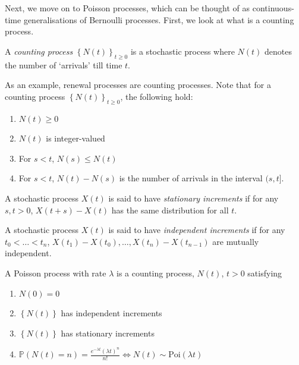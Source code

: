 \documentclass[12pt]{article}
\def\P{\mathbb{P}}
\def\ddfrac#1#2{\displaystyle\frac{\displaystyle #1}{\displaystyle #2}}
\theoremstyle{definition}
\begin{document}
    \medskip
    
    Next, we move on to Poisson processes, which can be thought of as continuous-time generalisations of Bernoulli processes. First, we look at what is a counting process. 
    
    \begin{defn}
        A \emph{counting process} $\left\{ N(t) \right\}_{t \geq 0}$ is a stochastic process where $N(t)$ denotes the number of `arrivals' till time $t$.
    \end{defn}
    As an example, renewal processes are counting processes. Note that for a counting process $\left\{ N(t) \right\}_{t \geq 0}$, the following hold:
    \begin{enumerate}
        \item $N(t) \geq 0$
        \item $N(t)$ is integer-valued
        \item For $s<t$, $N(s) \leq N(t)$
        \item For $s<t$, $N(t) - N(s)$ is the number of arrivals in the interval $(s,t]$.
    \end{enumerate}
    
    \begin{defn}
    A stochastic process $X(t)$ is said to have \emph{stationary increments} if for any $s,t > 0$, $X(t+s) - X(t)$ has the same distribution for all $t$.  
    \end{defn}
    
    \begin{defn}
    A stochastic process $X(t)$ is said to have \emph{independent increments} if for any $t_0 < \ldots < t_n$, $X(t_1) - X(t_0), \ldots , X(t_n) - X(t_{n-1})$ are mutually independent.
    \end{defn}
    
    \begin{defn}
        A Poisson process with rate $\lambda$ is a counting process, $N(t)$, $t>0$ satisfying
        \begin{enumerate}
            \item $N(0) = 0$
            \item $\left\{ N(t) \right\}$ has  independent increments
            \item $\left\{ N(t) \right\}$ has stationary increments
            \item $\P\left( N(t) = n \right) = \ddfrac{e^{-\lambda t} \left( \lambda t \right)^n}{n!} \iff N(t) \sim \text{Poi}(\lambda t)$
        \end{enumerate}
    \end{defn}
    
\end{document}
